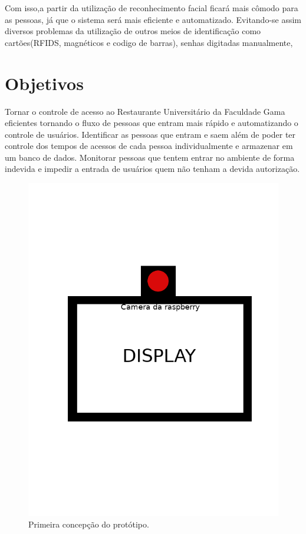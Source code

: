 \documentclass[conference,compsoc]{IEEEtran}
\begin{document}
Com isso,a partir da utilização de reconhecimento facial ficará mais
 cômodo para as pessoas, já que o sistema será mais eficiente e automatizado. Evitando-se assim diversos problemas da utilização de outros meios de identificação  como
cartões(RFIDS, magnéticos  e codigo de barras), senhas digitadas manualmente, 
 
 \section{Objetivos}
Tornar o controle de acesso ao Restaurante Universitário da Faculdade Gama eficientes tornando o fluxo de pessoas que entram mais rápido e automatizando o controle de usuários.
Identificar as pessoas que entram e saem além de poder ter
controle dos tempos de acessos de cada pessoa individualmente e armazenar em um banco de dados.
Monitorar pessoas que tentem entrar no ambiente de forma
indevida e impedir a entrada de usuários quem não tenham a
devida autorização.

 \begin{figure}[!ht]
		\centering
		\includegraphics[scale=0.25]{Prototipo.png}
		\caption{Primeira concepção do protótipo.}
\end{figure}
 
\end{document}
